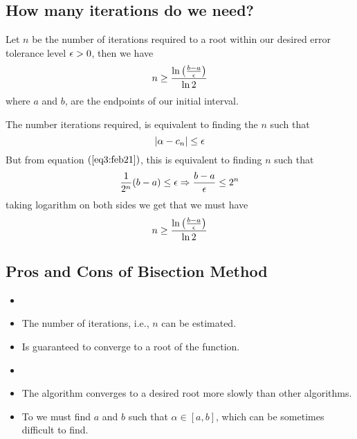 \subsection{How many iterations do we need?}

\begin{thm}
    Let $n$ be the number of iterations required to a root within our desired error tolerance level $\epsilon > 0$, then we have 
    \[
        n \geq \frac{\ln{\left( \frac{b-a}{\epsilon} \right)}}{\ln{2}}   
    \]
    where $a$ and $b$, are the endpoints of our initial interval. 
\end{thm}

The number iterations required, is equivalent to finding the $n$ such that 
\[
    |\alpha - c_n| \leq \epsilon    
\]
But from equation $(\ref{eq3:feb21})$, this is equivalent to finding $n$ such that 
\[
    \frac{1}{2^n}(b-a) \leq \epsilon \Rightarrow \frac{b-a}{\epsilon} \leq 2^n
\]  
taking logarithm on both sides we get that we must have 
\begin{equation}\label{eq4:feb21}
    n \geq \frac{\ln{\left( \frac{b-a}{\epsilon} \right)}}{\ln{2}}
\end{equation}

\subsection{Pros and Cons of Bisection Method}

\begin{tcolorbox}[
    colback = green!5,
    colframe = green!75
]
\begin{itemize}
    \item[\texty{Pros:}]
    \item The number of iterations, i.e., $n$ can be estimated.
    \item Is guaranteed to converge to a root of the function.
\end{itemize}
\end{tcolorbox}

\begin{tcolorbox}[
    colback = red!5,
    colframe = red!75
]
    \begin{itemize}
        \item[\texty{Cons:}]
        \item The algorithm converges to a desired root more slowly than other algorithms.
        \item To we must find $a$ and $b$ such that $\alpha \in [a,b]$, which can be sometimes difficult to find.
    \end{itemize}    
\end{tcolorbox}